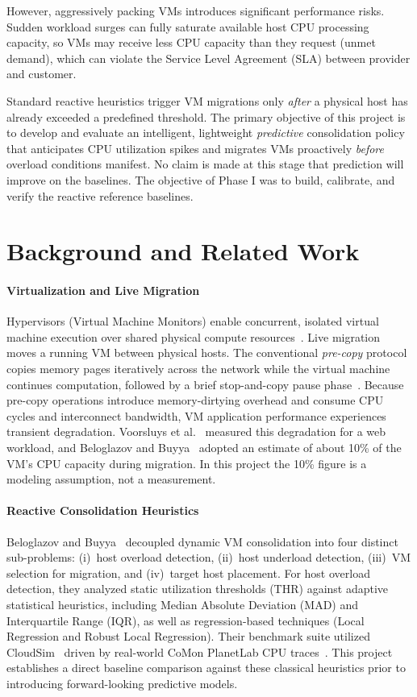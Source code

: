 \documentclass[11pt,a4paper]{article}
\begin{document}
However, aggressively packing VMs introduces significant performance risks. Sudden workload surges can fully saturate available host CPU processing capacity, so VMs may receive less CPU capacity than they request (unmet demand), which can violate the Service Level Agreement (SLA) between provider and customer.

Standard reactive heuristics trigger VM migrations only \emph{after} a physical host has already exceeded a predefined threshold. The primary objective of this project is to develop and evaluate an intelligent, lightweight \emph{predictive} consolidation policy that anticipates CPU utilization spikes and migrates VMs proactively \emph{before} overload conditions manifest. No claim is made at this stage that prediction will improve on the baselines. The objective of Phase I was to build, calibrate, and verify the reactive reference baselines.

\section{Background and Related Work}
\paragraph{Virtualization and Live Migration} Hypervisors (Virtual Machine Monitors) enable concurrent, isolated virtual machine execution over shared physical compute resources~\cite{marinescu2023}. Live migration moves a running VM between physical hosts. The conventional \emph{pre-copy} protocol copies memory pages iteratively across the network while the virtual machine continues computation, followed by a brief stop-and-copy pause phase~\cite{clark2005}. Because pre-copy operations introduce memory-dirtying overhead and consume CPU cycles and interconnect bandwidth, VM application performance experiences transient degradation. Voorsluys et al.~\cite{voorsluys2009} measured this degradation for a web workload, and Beloglazov and Buyya~\cite{beloglazov2012ccpe} adopted an estimate of about 10\% of the VM's CPU capacity during migration. In this project the 10\% figure is a modeling assumption, not a measurement.

\paragraph{Reactive Consolidation Heuristics} Beloglazov and Buyya~\cite{beloglazov2012ccpe} decoupled dynamic VM consolidation into four distinct sub-problems: (i)~host overload detection, (ii)~host underload detection, (iii)~VM selection for migration, and (iv)~target host placement. For host overload detection, they analyzed static utilization thresholds (THR) against adaptive statistical heuristics, including Median Absolute Deviation (MAD) and Interquartile Range (IQR), as well as regression-based techniques (Local Regression and Robust Local Regression). Their benchmark suite utilized CloudSim~\cite{calheiros2011} driven by real-world CoMon PlanetLab CPU traces~\cite{park2006comon}. This project establishes a direct baseline comparison against these classical heuristics prior to introducing forward-looking predictive models.
\end{document}
